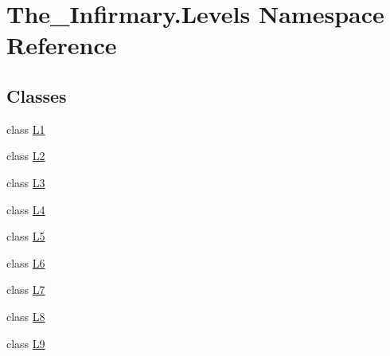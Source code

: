 \hypertarget{namespace_the___infirmary_1_1_levels}{}\section{The\+\_\+\+Infirmary.\+Levels Namespace Reference}
\label{namespace_the___infirmary_1_1_levels}
\subsection*{Classes}
\begin{DoxyCompactItemize}
\item 
class \mbox{\hyperlink{class_the___infirmary_1_1_levels_1_1_l1}{L1}}
\item 
class \mbox{\hyperlink{class_the___infirmary_1_1_levels_1_1_l2}{L2}}
\item 
class \mbox{\hyperlink{class_the___infirmary_1_1_levels_1_1_l3}{L3}}
\item 
class \mbox{\hyperlink{class_the___infirmary_1_1_levels_1_1_l4}{L4}}
\item 
class \mbox{\hyperlink{class_the___infirmary_1_1_levels_1_1_l5}{L5}}
\item 
class \mbox{\hyperlink{class_the___infirmary_1_1_levels_1_1_l6}{L6}}
\item 
class \mbox{\hyperlink{class_the___infirmary_1_1_levels_1_1_l7}{L7}}
\item 
class \mbox{\hyperlink{class_the___infirmary_1_1_levels_1_1_l8}{L8}}
\item 
class \mbox{\hyperlink{class_the___infirmary_1_1_levels_1_1_l9}{L9}}
\end{DoxyCompactItemize}
